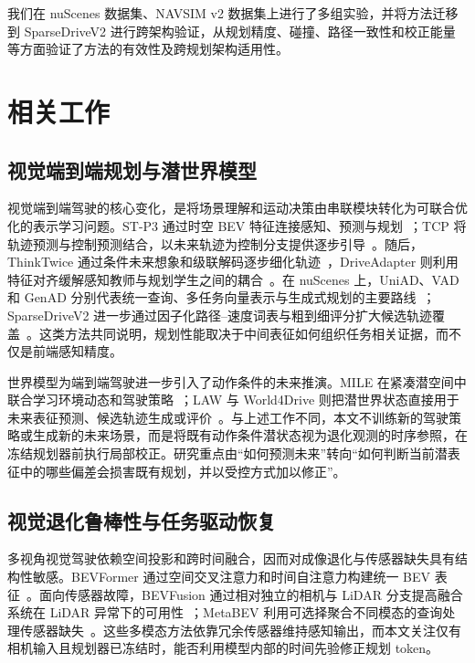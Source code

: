 \documentclass[letterpaper,10pt,conference]{ieeeconf}
\begin{document}
我们在 nuScenes 数据集、NAVSIM v2 数据集上进行了多组实验，并将方法迁移到 SparseDriveV2 进行跨架构验证，从规划精度、碰撞、路径一致性和校正能量等方面验证了方法的有效性及跨规划架构适用性。

\section{相关工作}

\subsection{视觉端到端规划与潜世界模型}

视觉端到端驾驶的核心变化，是将场景理解和运动决策由串联模块转化为可联合优化的表示学习问题。ST-P3 通过时空 BEV 特征连接感知、预测与规划~\cite{hu2022stp3}；TCP 将轨迹预测与控制预测结合，以未来轨迹为控制分支提供逐步引导~\cite{wu2022tcp}。随后，ThinkTwice 通过条件未来想象和级联解码逐步细化轨迹~\cite{jia2023thinktwice}，DriveAdapter 则利用特征对齐缓解感知教师与规划学生之间的耦合~\cite{jia2023driveadapter}。在 nuScenes 上，UniAD、VAD 和 GenAD 分别代表统一查询、多任务向量表示与生成式规划的主要路线~\cite{hu2023uniad,jiang2023vad,zheng2024genad}；SparseDriveV2 进一步通过因子化路径--速度词表与粗到细评分扩大候选轨迹覆盖~\cite{sun2026sparsedrivev2}。这类方法共同说明，规划性能取决于中间表征如何组织任务相关证据，而不仅是前端感知精度。

世界模型为端到端驾驶进一步引入了动作条件的未来推演。MILE 在紧凑潜空间中联合学习环境动态和驾驶策略~\cite{hu2022mile}；LAW 与 World4Drive 则把潜世界状态直接用于未来表征预测、候选轨迹生成或评价~\cite{li2025law,zheng2025world4drive}。与上述工作不同，本文不训练新的驾驶策略或生成新的未来场景，而是将既有动作条件潜状态视为退化观测的时序参照，在冻结规划器前执行局部校正。研究重点由“如何预测未来”转向“如何判断当前潜表征中的哪些偏差会损害既有规划，并以受控方式加以修正”。

\subsection{视觉退化鲁棒性与任务驱动恢复}

多视角视觉驾驶依赖空间投影和跨时间融合，因而对成像退化与传感器缺失具有结构性敏感。BEVFormer 通过空间交叉注意力和时间自注意力构建统一 BEV 表征~\cite{li2022bevformer}。面向传感器故障，BEVFusion 通过相对独立的相机与 LiDAR 分支提高融合系统在 LiDAR 异常下的可用性~\cite{liang2022bevfusion}；MetaBEV 利用可选择聚合不同模态的查询处理传感器缺失~\cite{ge2023metabev}。这些多模态方法依靠冗余传感器维持感知输出，而本文关注仅有相机输入且规划器已冻结时，能否利用模型内部的时间先验修正规划 token。
\end{document}
